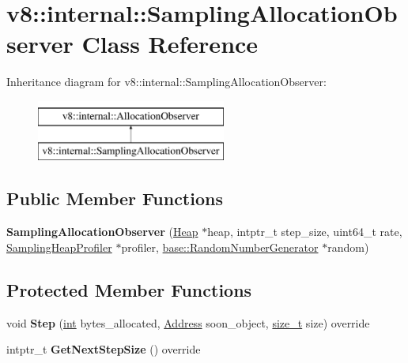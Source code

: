 \hypertarget{classv8_1_1internal_1_1SamplingAllocationObserver}{}\section{v8\+:\+:internal\+:\+:Sampling\+Allocation\+Observer Class Reference}
\label{classv8_1_1internal_1_1SamplingAllocationObserver}
Inheritance diagram for v8\+:\+:internal\+:\+:Sampling\+Allocation\+Observer\+:\begin{figure}[H]
\begin{center}
\leavevmode
\includegraphics[height=2.000000cm]{classv8_1_1internal_1_1SamplingAllocationObserver}
\end{center}
\end{figure}
\subsection*{Public Member Functions}
\begin{DoxyCompactItemize}
\item 
\mbox{\label{classv8_1_1internal_1_1SamplingAllocationObserver_a60bf25c58608f2666d0843666145b554}} 
{\bfseries Sampling\+Allocation\+Observer} (\mbox{\hyperlink{classv8_1_1internal_1_1Heap}{Heap}} $\ast$heap, intptr\+\_\+t step\+\_\+size, uint64\+\_\+t rate, \mbox{\hyperlink{classv8_1_1internal_1_1SamplingHeapProfiler}{Sampling\+Heap\+Profiler}} $\ast$profiler, \mbox{\hyperlink{classv8_1_1base_1_1RandomNumberGenerator}{base\+::\+Random\+Number\+Generator}} $\ast$random)
\end{DoxyCompactItemize}
\subsection*{Protected Member Functions}
\begin{DoxyCompactItemize}
\item 
\mbox{\label{classv8_1_1internal_1_1SamplingAllocationObserver_a3b95036f997dfdc2a581f50de752f80f}} 
void {\bfseries Step} (\mbox{\hyperlink{classint}{int}} bytes\+\_\+allocated, \mbox{\hyperlink{classuintptr__t}{Address}} soon\+\_\+object, \mbox{\hyperlink{classsize__t}{size\+\_\+t}} size) override
\item 
\mbox{\label{classv8_1_1internal_1_1SamplingAllocationObserver_aae9dd259b530e7993fbb241a0406dd2a}} 
intptr\+\_\+t {\bfseries Get\+Next\+Step\+Size} () override
\end{DoxyCompactItemize}
